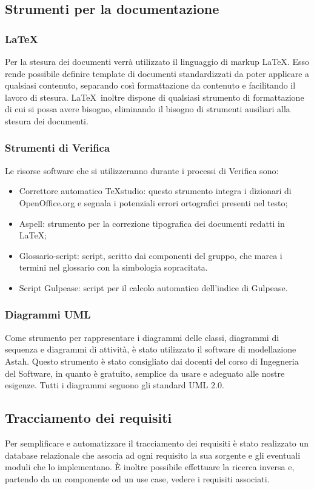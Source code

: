 \subsection{Strumenti per la documentazione}
\label{}
\subsubsection{LaTeX}
\label{5.7}
Per la stesura dei documenti verrà utilizzato il linguaggio di markup \LaTeX. Esso rende possibile definire template di documenti standardizzati da poter applicare a qualsiasi contenuto, separando così formattazione da contenuto e facilitando il lavoro di stesura. \LaTeX\ inoltre dispone di qualsiasi strumento di formattazione di cui si possa avere bisogno, eliminando il bisogno di strumenti ausiliari alla stesura dei documenti.

\subsubsection{Strumenti di Verifica}
\label{}
Le risorse software che si utilizzeranno durante i processi di Verifica sono:
\begin{itemize}
\item Correttore automatico TeXstudio: questo strumento integra i dizionari di OpenOffice.org e segnala i potenziali errori ortografici presenti nel testo;
\item Aspell: strumento per la correzione tipografica dei documenti redatti in \LaTeX ;
\item Glossario-script: script, scritto dai componenti del gruppo, che marca i termini nel glossario con la simbologia sopracitata.
\item Script Gulpease: script per il calcolo automatico dell'indice di Gulpease.
\end{itemize}

\subsubsection{Diagrammi UML}
Come strumento per rappresentare i diagrammi delle classi, diagrammi di sequenza e diagrammi di attività, è stato utilizzato il software di modellazione Astah. Questo strumento è stato consigliato dai docenti del corso di Ingegneria del Software, in quanto è gratuito, semplice da usare e adeguato alle nostre esigenze. Tutti i diagrammi seguono gli standard UML 2.0.

\subsection{Tracciamento dei requisiti}
\label{}
Per semplificare e automatizzare il tracciamento dei requisiti è stato realizzato un database relazionale che associa ad ogni requisito la sua sorgente e gli eventuali moduli che lo implementano. È inoltre possibile effettuare la ricerca inversa e, partendo da un componente od un use case, vedere i requisiti associati.



